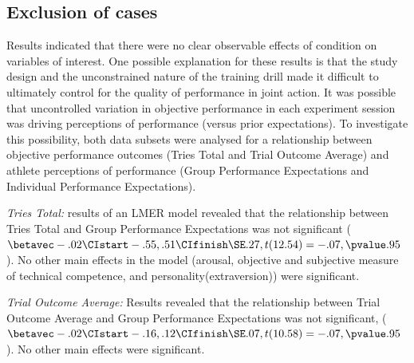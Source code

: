 
\subsection{Exclusion of cases}
Results indicated that there were no clear observable effects of condition on variables of interest.  One possible explanation for these results is that the study design and the unconstrained nature of the training drill made it difficult to ultimately control for the quality of performance in joint action.  It was possible that uncontrolled variation in objective performance in each experiment session was driving perceptions of performance (versus prior expectations).  To investigate this possibility, both data subsets were analysed for a relationship between objective performance outcomes (Tries Total and Trial Outcome Average) and athlete perceptions of performance (Group Performance Expectations and Individual Performance Expectations).

\textit{Tries Total:} results of an LMER model revealed that the relationship between Tries Total and Group Performance Expectations was not significant ($\betavec -.02 \CIstart -.55, .51 \CIfinish \SE .27, t(12.54)= -.07, \pvalue .95$).  No other main effects in the model (arousal, objective and subjective measure of technical competence, and personality(extraversion)) were significant.

\textit{Trial Outcome Average:} Results revealed that the relationship between Trial Outcome Average and Group Performance Expectations was not significant, ($\betavec -.02 \CIstart -.16, .12 \CIfinish \SE .07, t(10.58)= -.07, \pvalue .95$). No other main effects were significant.

